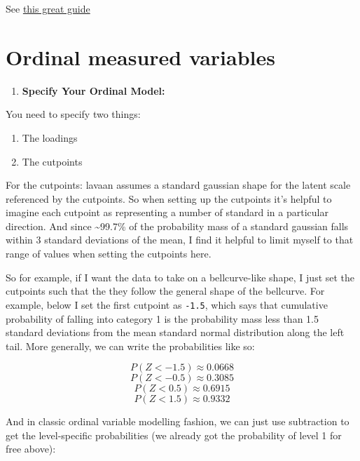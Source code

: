 \documentclass[
  letterpaper,
  DIV=11,
  numbers=noendperiod]{scrreprt}
\providecommand{\tightlist}{%
  \setlength{\itemsep}{0pt}\setlength{\parskip}{0pt}}\usepackage{longtable,booktabs,array}
\begin{document}
See
\href{https://bookdown.org/marklhc/notes/simulation-example-on-structural-equation-modeling-sem.html\#full-example-of-a-small-scale-simulation}{this
great guide}

\hypertarget{ordinal-measured-variables}{%
\section{Ordinal measured variables}\label{ordinal-measured-variables}}

\begin{enumerate}
\def\labelenumi{\arabic{enumi}.}
\tightlist
\item
  \textbf{Specify Your Ordinal Model:}
\end{enumerate}

You need to specify two things:

\begin{enumerate}
\def\labelenumi{\arabic{enumi}.}
\tightlist
\item
  The loadings
\item
  The cutpoints
\end{enumerate}

For the cutpoints: lavaan assumes a standard gaussian shape for the
latent scale referenced by the cutpoints. So when setting up the
cutpoints it's helpful to imagine each cutpoint as representing a number
of standard in a particular direction. And since \textasciitilde99.7\%
of the probability mass of a standard gaussian falls within 3 standard
deviations of the mean, I find it helpful to limit myself to that range
of values when setting the cutpoints here.

So for example, if I want the data to take on a bellcurve-like shape, I
just set the cutpoints such that the they follow the general shape of
the bellcurve. For example, below I set the first cutpoint as
\texttt{-1.5}, which says that cumulative probability of falling into
category 1 is the probability mass less than 1.5 standard deviations
from the mean standard normal distribution along the left tail. More
generally, we can write the probabilities like so:

\[
P(Z < -1.5) \approx 0.0668
\] \[
P(Z < -0.5) \approx 0.3085
\] \[
P(Z < 0.5) \approx 0.6915
\] \[
P(Z < 1.5) \approx 0.9332
\]

And in classic ordinal variable modelling fashion, we can just use
subtraction to get the level-specific probabilities (we already got the
probability of level 1 for free above):
\end{document}
